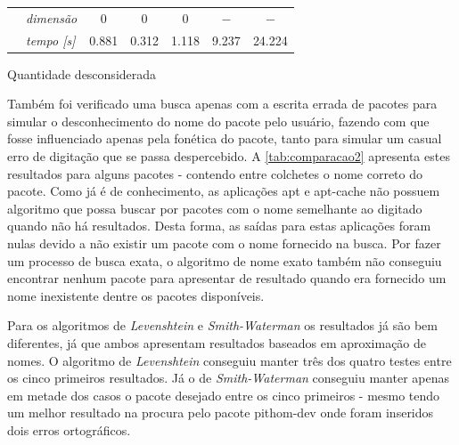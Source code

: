 \begin{table}[htbp]
{\begin{tabular}[c]{clccccc}
\rowcolor[gray]{0.9}
\multicolumn{ 1}{c}{\textbf{[gzip]}} & \textit{dimensão} & 0 & 0 & 0 & $-$ & $-$ \\ 
\multicolumn{ 1}{l}{} & \textit{tempo [s]} & 0.881 & 0.312 & 1.118 & 9.237 & 24.224 \\ \bottomrule
\end{tabular}
}
\label{tab:comparacao2}
\begin{description}
	\tiny
	\item [$-$] Quantidade desconsiderada
\end{description}
\end{table}

Também foi verificado uma busca apenas com a escrita errada de pacotes para simular o desconhecimento do nome do pacote pelo usuário, fazendo com que fosse influenciado apenas pela fonética do pacote, tanto para simular um casual erro de digitação que se passa despercebido. A \autoref{tab:comparacao2} apresenta estes resultados para alguns pacotes - contendo entre colchetes o nome correto do pacote. Como já é de conhecimento, as aplicações {\code apt} e {\code apt-cache} não possuem algoritmo que possa buscar por pacotes com o nome semelhante ao digitado quando não há resultados. Desta forma, as saídas para estas aplicações foram nulas devido a não existir um pacote com o nome fornecido na busca. Por fazer um processo de busca exata, o algoritmo de nome exato também não conseguiu encontrar nenhum pacote para apresentar de resultado quando era fornecido um nome inexistente dentre os pacotes disponíveis. 

Para os algoritmos de \textit{Levenshtein} e \textit{Smith-Waterman} os resultados já são bem diferentes, já  que ambos apresentam resultados baseados em aproximação de nomes. O algoritmo de \textit{Levenshtein} conseguiu manter três dos quatro testes entre os cinco primeiros resultados. Já o de \textit{Smith-Waterman} conseguiu manter apenas em metade dos casos o pacote desejado entre os cinco primeiros - mesmo tendo um melhor resultado na procura pelo pacote {\code pithom-dev} onde foram inseridos dois erros ortográficos.


